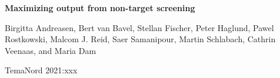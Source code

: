 \begin{titlepage}

\vspace*{7cm}

{\Huge\bfseries Maximizing output from non-target screening\par}

\vspace{1.5cm}
  
{\normalsize Birgitta Andreasen, Bert van Bavel, Stellan Fischer, Peter Haglund, Pawel Rostkowski, Malcom J. Reid, Saer Samanipour, Martin Schlabach, Cathrin Veenaas, and Maria Dam\par}

\vfill

{\large TemaNord 2021:xxx\par}

\vspace*{2cm}

\end{titlepage}
